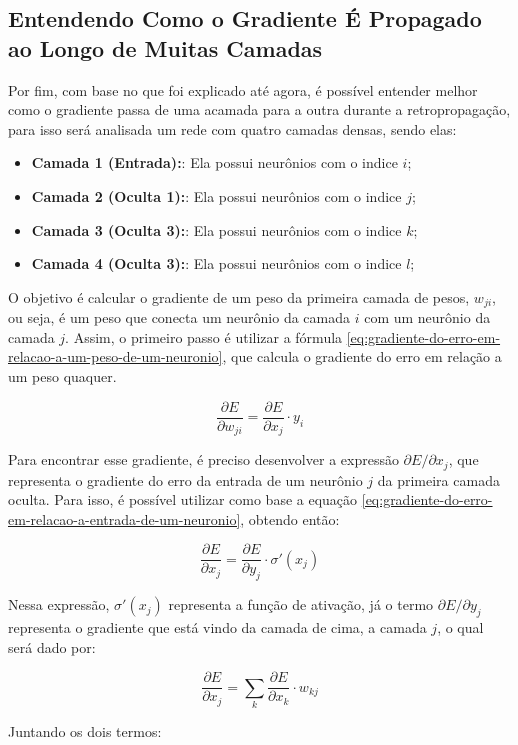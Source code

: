 \subsection{Entendendo Como o Gradiente É Propagado ao Longo de Muitas Camadas}

Por fim, com base no que foi explicado até agora, é possível entender melhor como o gradiente passa de uma acamada para a outra durante a retropropagação, para isso será analisada um rede com quatro camadas densas, sendo elas:

\begin{itemize}
    \item \textbf{Camada 1 (Entrada):}: Ela possui neurônios com o indice $i$;
    \item \textbf{Camada 2 (Oculta 1):}: Ela possui neurônios com o indice $j$;
    \item \textbf{Camada 3 (Oculta 3):}: Ela possui neurônios com o indice $k$;
    \item \textbf{Camada 4 (Oculta 3):}: Ela possui neurônios com o indice $l$;
\end{itemize}

O objetivo é calcular o gradiente de um peso da primeira camada de pesos, $w_{ji}$, ou seja, é um peso que conecta um neurônio da camada $i$ com um neurônio da camada $j$. Assim, o primeiro passo é utilizar a fórmula \ref{eq:gradiente-do-erro-em-relacao-a-um-peso-de-um-neuronio}, que calcula o gradiente do erro em relação a um peso quaquer.

\[
    \frac{\partial E}{\partial w_{ji}} = \frac{\partial E}{\partial x_j} \cdot y_i
\]

Para encontrar esse gradiente, é preciso desenvolver a expressão $\partial E / \partial x_j$, que representa o gradiente do erro da entrada de um neurônio $j$ da primeira camada oculta. Para isso, é possível utilizar como base a equação \ref{eq:gradiente-do-erro-em-relacao-a-entrada-de-um-neuronio}, obtendo então:

\[
    \frac{\partial E}{\partial x_j} = \frac{\partial E}{\partial y_j} \cdot \sigma'(x_j)
\]

Nessa expressão, $\sigma'(x_j)$ representa a função de ativação, já o termo $\partial E / \partial y_j$ representa o gradiente que está vindo da camada de cima, a camada $j$, o qual será dado por:

\[
    \frac{\partial E}{\partial x_j} = \sum_k \frac{\partial E}{\partial x_k} \cdot w_{kj}
\]

Juntando os dois termos:

